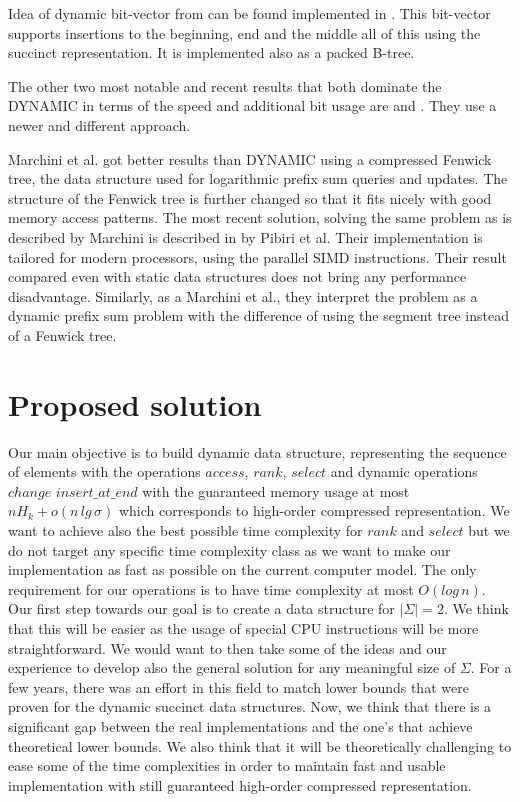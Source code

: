Idea of dynamic bit-vector from \cite{policriti2015average} can be found implemented in \cite{ds-bitvector}. This bit-vector supports insertions to the beginning, end and the middle all of this using the succinct representation. It is implemented also as a packed B-tree.

The other two most notable and recent results that both dominate the DYNAMIC in terms of the speed and additional bit usage are \cite{marchini2020compact} and \cite{pibiri2020rank}. They use a newer and different approach.

Marchini et al. got better results than DYNAMIC using a compressed Fenwick tree\cite{marchini2020compact}, the data structure used for logarithmic prefix sum queries and updates\cite{fenwick1994new}. The structure of the Fenwick tree is further changed so that it fits nicely with good memory access patterns. The most recent solution, solving the same problem as is described by Marchini is described in \cite{pibiri2020rank} by Pibiri et al. Their implementation is tailored for modern processors, using the parallel SIMD instructions. Their result compared even with static data structures does not bring any performance disadvantage. Similarly, as a Marchini et al., they interpret the problem as a dynamic prefix sum problem with the difference of using the segment tree instead of a Fenwick tree.

\section{Proposed solution}

Our main objective is to build dynamic data structure, representing the sequence of elements with the operations $access$, $rank$, $select$ and dynamic operations $change$ $insert\_at\_end$ with the guaranteed memory usage at most $nH_k+o(n\,lg\,\sigma)$ which corresponds to high-order compressed representation. We want to achieve also the best possible time complexity for $rank$ and $select$ but we do not target any specific time complexity class as we want to make our implementation as fast as possible on the current computer model. The only requirement for our operations is to have time complexity at most $O(log\,n)$. Our first step towards our goal is to create a data structure for $|\Sigma|=2$. We think that this will be easier as the usage of special CPU instructions will be more straightforward. We would want to then take some of the ideas and our experience to develop also the general solution for any meaningful size of $\Sigma$. For a few years, there was an effort in this field to match lower bounds that were proven for the dynamic succinct data structures. Now, we think that there is a significant gap between the real implementations and the one's that achieve theoretical lower bounds. We also think that it will be theoretically challenging to ease some of the time complexities in order to maintain fast and usable implementation with still guaranteed high-order compressed representation.
